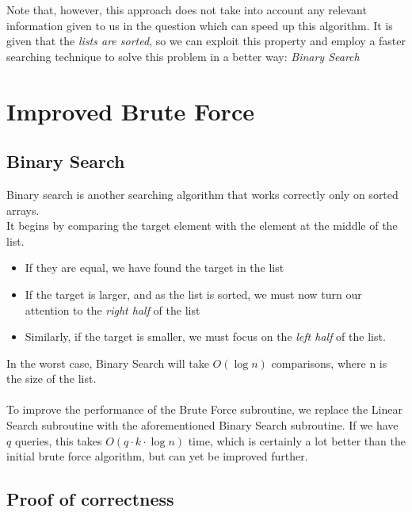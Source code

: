\documentclass[11pt]{article}
\begin{document}
Note that, however, this approach does not take into account any relevant information given to us in the question which can speed up this algorithm. It is given that the \textit{lists are sorted}, so we can exploit this property and employ a faster searching technique to solve this problem in a better way: \textit{Binary Search}




\section{Improved Brute Force}
\subsection{Binary Search}



Binary search is another searching algorithm that works correctly only on sorted arrays. \\
It begins by comparing the target element with the element at the middle of the list. 
\begin{itemize}
    \item If they are equal, we have found the target in the list
    \item If the target is larger, and as the list is sorted, we must now turn our attention to the \textit{right half} of the list
    \item Similarly, if the target is smaller, we must focus on the \textit{left half} of the list.
\end{itemize}

In the worst case, Binary Search will take $O(\log n)$ comparisons, where n is the size of the list. \\ \\


To improve the performance of the Brute Force subroutine, we replace the Linear Search subroutine with the aforementioned Binary Search subroutine. If we have $q$ queries, this takes $O(q \cdot k \cdot \log n)$ time, which is certainly a lot better than the initial brute force algorithm, but can yet be improved further.


\subsection{Proof of correctness}
\end{document}
